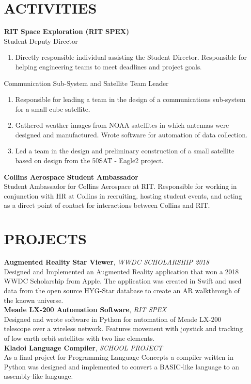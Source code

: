\documentclass[line, margin]{res}
\begin{document}
\begin{resume}
\section{ACTIVITIES}
\textbf{RIT Space Exploration (RIT SPEX)}\\
Student Deputy Director
	\begin{enumerate}
		\item[]Directly responsible individual assisting the Student Director.  Responsible for helping engineering teams to meet deadlines and project goals.
	\end{enumerate}
      
Communication Sub-System and  Satellite Team Leader
      \begin{enumerate}
        \item[] Responsible for leading a team in the design of a communications sub-system for a small cube satellite.
        \item[] Gathered weather images from NOAA satellites in which antennas were designed and manufactured. Wrote software for automation of data collection.
        \item[] Led a team in the design and preliminary construction of a small satellite based on design from the \textdollar 50SAT - Eagle2 project.
      \end{enumerate}
      

\textbf{Collins Aerospace Student Ambassador}\\
Student Ambassador for Collins Aerospace at RIT.  Responsible for working in conjunction with HR at Collins in recruiting, hosting student events, and acting as a direct point of contact for interactions between Collins and RIT.
      
      
\section{PROJECTS}
\textbf{Augmented Reality Star Viewer}, \textit{WWDC SCHOLARSHIP 2018}\\
Designed and Implemented an Augmented Reality application that won a 2018 WWDC Scholarship from Apple.  The application was created in Swift and used data from the open source HYG-Star database to create an AR walkthrough of the known universe.
\\ [10pt]
\textbf{Meade LX-200 Automation Software}, \textit{RIT SPEX}\\
Designed and wrote software in Python for automation of Meade LX-200 telescope over a wireless network.  Features movement with joystick and tracking of low earth orbit satellites with two line elements.
\\ [10pt]
\textbf{Kladoi Language Compiler}, \textit{SCHOOL PROJECT}\\
As a final project for Programming Language Concepts a compiler written in Python was designed and implemented to convert a BASIC-like language to an assembly-like language.



\end{resume}
\end{document}
